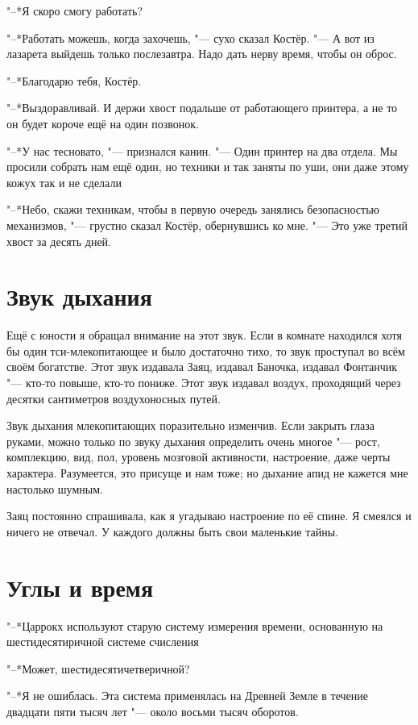 "--*Я скоро смогу работать?

"--*Работать можешь, когда захочешь, "--- сухо сказал Костёр.
"--- А вот из лазарета выйдешь только послезавтра.
Надо дать нерву время, чтобы он оброс.

"--*Благодарю тебя, Костёр.

"--*Выздоравливай.
И держи хвост подальше от работающего принтера, а не то он будет короче ещё на один позвонок.

"--*У нас тесновато, "--- признался канин.
"--- Один принтер на два отдела.
Мы просили собрать нам ещё один, но техники и так заняты по уши, они даже этому кожух так и не сделали\ldotst

"--*Небо, скажи техникам, чтобы в первую очередь занялись безопасностью механизмов, "--- грустно сказал Костёр, обернувшись ко мне.
"--- Это уже третий хвост за десять дней.

\section{Звук дыхания}

Ещё с юности я обращал внимание на этот звук.
Если в комнате находился хотя бы один тси-млекопитающее и было достаточно тихо, то звук проступал во всём своём богатстве.
Этот звук издавала Заяц, издавал Баночка, издавал Фонтанчик "--- кто-то повыше, кто-то пониже.
Этот звук издавал воздух, проходящий через десятки сантиметров воздухоносных путей.

Звук дыхания млекопитающих поразительно изменчив.
Если закрыть глаза руками, можно только по звуку дыхания определить очень многое "--- рост, комплекцию, вид, пол, уровень мозговой активности, настроение, даже черты характера.
Разумеется, это присуще и нам тоже;
но дыхание апид не кажется мне настолько шумным.

Заяц постоянно спрашивала, как я угадываю настроение по её спине.
Я смеялся и ничего не отвечал.
У каждого должны быть свои маленькие тайны.

\section{Углы и время}

"--*Царрокх используют старую систему измерения времени, основанную на шестидесятиричной системе счисления\ldotst

"--*Может, шестидесятичетверичной?

"--*Я не ошиблась.
Эта система применялась на Древней Земле в течение двадцати пяти тысяч лет "--- около восьми тысяч оборотов.

